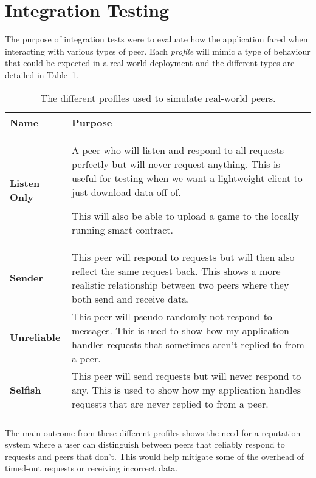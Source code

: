 \section{Integration Testing}

The purpose of integration tests were to evaluate how the application fared when interacting with various types of peer. Each \textit{profile} will mimic a type of behaviour that could be expected in a real-world deployment and the different types are detailed in Table~\ref{tab:profiles}.

\small
\begin{longtable}{p{} p{}}
  \toprule
  \textbf{Name} & \textbf{Purpose}
  \\\midrule\midrule
  \textbf{Listen Only}
  & A peer who will listen and respond to all requests perfectly but will never request anything. This is useful for testing when we want a lightweight client to just download data off of. 
  
  This will also be able to upload a game to the locally running smart contract.
  \\
  \textbf{Sender}
  & This peer will respond to requests but will then also reflect the same request back. This shows a more realistic relationship between two peers where they both send and receive data.
  \\
  \textbf{Unreliable}
  & This peer will pseudo-randomly not respond to messages. This is used to show how my application handles requests that sometimes aren't replied to from a peer.
  \\
  \textbf{Selfish}
  & This peer will send requests but will never respond to any. This is used to show how my application handles requests that are never replied to from a peer.
  \\\bottomrule\bottomrule
  \caption{The different profiles used to simulate real-world peers.}
  \label{tab:profiles}
\end{longtable}
\normalsize

\noindent
The main outcome from these different profiles shows the need for a reputation system where a user can distinguish between peers that reliably respond to requests and peers that don't. This would help mitigate some of the overhead of timed-out requests or receiving incorrect data.
